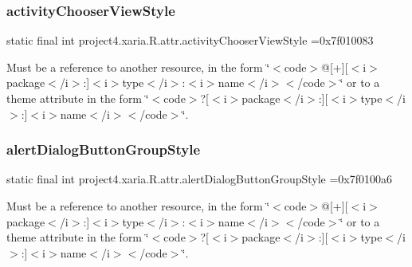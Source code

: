 \subsubsection{\texorpdfstring{activity\+Chooser\+View\+Style}{activityChooserViewStyle}}
{\footnotesize\ttfamily static final int project4.\+xaria.\+R.\+attr.\+activity\+Chooser\+View\+Style =0x7f010083\hspace{0.3cm}{\ttfamily [static]}}

Must be a reference to another resource, in the form \char`\"{}$<$code$>$@\mbox{[}+\mbox{]}\mbox{[}$<$i$>$package$<$/i$>$\+:\mbox{]}$<$i$>$type$<$/i$>$\+:$<$i$>$name$<$/i$>$$<$/code$>$\char`\"{} or to a theme attribute in the form \char`\"{}$<$code$>$?\mbox{[}$<$i$>$package$<$/i$>$\+:\mbox{]}\mbox{[}$<$i$>$type$<$/i$>$\+:\mbox{]}$<$i$>$name$<$/i$>$$<$/code$>$\char`\"{}. \mbox{\label{classproject4_1_1xaria_1_1R_1_1attr_a92454ec0575a4b9c338de8e80ceff39c}} 
\subsubsection{\texorpdfstring{alert\+Dialog\+Button\+Group\+Style}{alertDialogButtonGroupStyle}}
{\footnotesize\ttfamily static final int project4.\+xaria.\+R.\+attr.\+alert\+Dialog\+Button\+Group\+Style =0x7f0100a6\hspace{0.3cm}{\ttfamily [static]}}

Must be a reference to another resource, in the form \char`\"{}$<$code$>$@\mbox{[}+\mbox{]}\mbox{[}$<$i$>$package$<$/i$>$\+:\mbox{]}$<$i$>$type$<$/i$>$\+:$<$i$>$name$<$/i$>$$<$/code$>$\char`\"{} or to a theme attribute in the form \char`\"{}$<$code$>$?\mbox{[}$<$i$>$package$<$/i$>$\+:\mbox{]}\mbox{[}$<$i$>$type$<$/i$>$\+:\mbox{]}$<$i$>$name$<$/i$>$$<$/code$>$\char`\"{}. \mbox{\label{classproject4_1_1xaria_1_1R_1_1attr_a7ab87094dd6904302004cd074672ce58}} 
